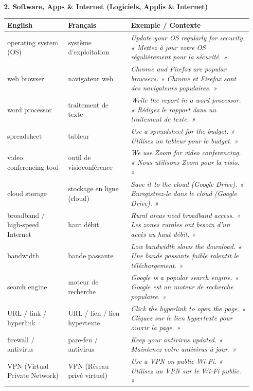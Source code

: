 \documentclass[11pt]{article}
\newcommand{\eng}[1]{\ifmmode\text{\textit{#1}}\else\begingroup\selectlanguage{english}\itshape #1\endgroup\fi}
\begin{document}
\textbf{2. Software, Apps \& Internet (Logiciels, Applis \& Internet)}
\begin{center}
\begin{tabularx}{\linewidth}{|X|X|X|}\hline
\rowcolor{poporangeL} \textbf{English} & \textbf{Français} & \textbf{Exemple / Contexte} \\ \hline
operating system (OS) & système d'exploitation & \eng{Update your OS regularly for security.} « Mettez à jour votre OS régulièrement pour la sécurité. » \\ \hline
web browser & navigateur web & \eng{Chrome and Firefox are popular browsers.} « Chrome et Firefox sont des navigateurs populaires. » \\ \hline
word processor & traitement de texte & \eng{Write the report in a word processor.} « Rédigez le rapport dans un traitement de texte. » \\ \hline
spreadsheet & tableur & \eng{Use a spreadsheet for the budget.} « Utilisez un tableur pour le budget. » \\ \hline
video conferencing tool & outil de visioconférence & \eng{We use Zoom for video conferencing.} « Nous utilisons Zoom pour la visio. » \\ \hline
cloud storage & stockage en ligne (cloud) & \eng{Save it to the cloud (Google Drive).} « Enregistrez-le dans le cloud (Google Drive). » \\ \hline
broadband / high-speed Internet & haut débit & \eng{Rural areas need broadband access.} « Les zones rurales ont besoin d'un accès au haut débit. » \\ \hline
bandwidth & bande passante & \eng{Low bandwidth slows the download.} « Une bande passante faible ralentit le téléchargement. » \\ \hline
search engine & moteur de recherche & \eng{Google is a popular search engine.} « Google est un moteur de recherche populaire. » \\ \hline
URL / link / hyperlink & URL / lien / lien hypertexte & \eng{Click the hyperlink to open the page.} « Cliquez sur le lien hypertexte pour ouvrir la page. » \\ \hline
firewall / antivirus & pare-feu / antivirus & \eng{Keep your antivirus updated.} « Maintenez votre antivirus à jour. » \\ \hline
VPN (Virtual Private Network) & VPN (Réseau privé virtuel) & \eng{Use a VPN on public Wi-Fi.} « Utilisez un VPN sur le Wi-Fi public. » \\ \hline
\end{tabularx}
\end{center}
\end{document}
